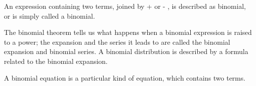  An expression containing two terms, joined by + or - , is described
as binomial, or is simply called a binomial.
\par
The binomial theorem tells us what happens when a binomial
expression is raised to a power; the expansion and the series it leads
to are called the binomial expansion and binomial series. A binomial
distribution is described by a formula related to the binomial 
expansion.
\par
A binomial equation is a particular kind of equation, which contains
two terms.